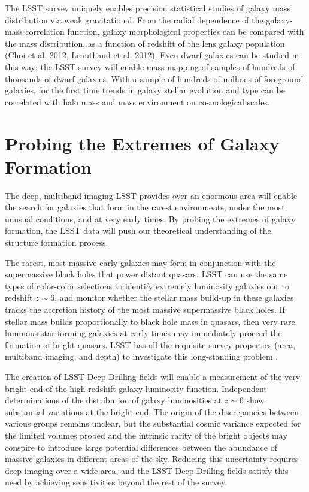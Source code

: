 {The LSST survey uniquely enables precision statistical studies of 
galaxy mass
distribution via weak gravitational.
From the radial dependence of
the galaxy-mass correlation function, galaxy morphological properties 
can be compared with the mass distribution, as a function
of redshift of the lens galaxy population (Choi et al. 2012,
Leauthaud et al. 2012).  Even dwarf galaxies 
can be studied in this way: the LSST survey will enable mass
mapping of samples of hundreds of thousands of dwarf galaxies.
With a sample of hundreds of millions of foreground galaxies, 
for the first time trends in galaxy stellar evolution and type 
can be correlated with halo mass and mass environment on cosmological scales.

\section{Probing the Extremes of Galaxy Formation}
\label{sec:sci:gal:bkgnd:rare}

The deep, multiband imaging LSST provides over an enormous
area will enable the search for galaxies that form in the
rarest environments, under the most unusual conditions,
and at very early times. By probing the extremes of
galaxy formation, the LSST data will push our theoretical
understanding of the structure formation process.

The rarest, most massive early galaxies may form in 
conjunction with the supermassive black holes that
power distant quasars. LSST can use the same
types of color-color selections to identify extremely
luminosity galaxies out to redshift $z\sim6$, and
monitor whether the stellar mass build-up in these
galaxies tracks the accretion history of the most
massive supermassive black holes. If stellar mass
builds proportionally to black hole mass in quasars,
then very rare luminous star forming galaxies at
early times may immediately proceed the formation
of bright quasars. LSST has all the requisite
survey properties (area, multiband imaging, and
depth) to investigate this long-standing problem \citep{robertson2007a}.

The creation of LSST Deep Drilling fields will
enable a measurement of the very bright end
of the high-redshift galaxy luminosity function.
Independent determinations of the distribution of 
galaxy luminosities at $z\sim6$ show substantial
variations at the bright end. The origin of
the discrepancies between various groups remains
unclear, but the substantial cosmic variance expected
for the limited volumes probed and the intrinsic
rarity of the bright objects may conspire to
introduce large potential differences between
the abundance of massive galaxies in different
areas of the sky. Reducing this uncertainty requires
deep imaging over a wide area, and the LSST Deep Drilling
fields satisfy this need by achieving sensitivities
beyond the rest of the survey. 

}
